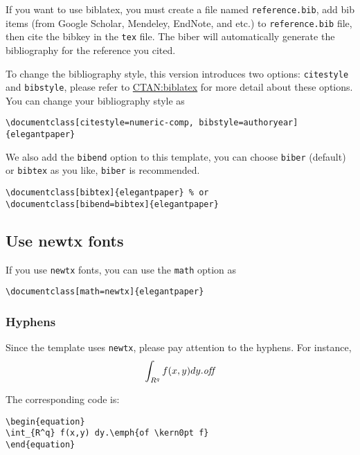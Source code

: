 \documentclass[lang=en,a4paper,bibend=bibtex]{elegantcs}
\begin{document}
If you want to use biblatex, you must create a file named \lstinline{reference.bib}, add bib items (from Google Scholar, Mendeley, EndNote, and etc.) to \lstinline{reference.bib} file, then cite the bibkey in the \lstinline{tex} file. The biber will automatically generate the bibliography for the reference you cited.


To change the bibliography style, this version introduces two options: \lstinline{citestyle} and \lstinline{bibstyle}, please refer to \href{https://ctan.org/pkg/biblatex}{CTAN:biblatex} for more detail about these options. You can change your bibliography style as

\begin{lstlisting}[style=Latex]
\documentclass[citestyle=numeric-comp, bibstyle=authoryear]{elegantpaper}
\end{lstlisting}

We also add the \lstinline{bibend} option to this template, you can choose \lstinline{biber} (default) or \lstinline{bibtex} as you like, \lstinline{biber} is recommended.

\begin{lstlisting}[style=Latex]
\documentclass[bibtex]{elegantpaper} % or
\documentclass[bibend=bibtex]{elegantpaper}
\end{lstlisting}



\subsection{Use newtx fonts}
If you use \lstinline{newtx} fonts, you can use the \lstinline{math} option as
\begin{lstlisting}[style=Latex]
\documentclass[math=newtx]{elegantpaper}
\end{lstlisting}


\subsubsection{Hyphens}
Since the template uses \lstinline{newtx}, please pay attention to the hyphens. For instance,
\begin{equation}
\int_{R^q} f(x,y) dy.\emph{of\kern0pt f}
\end{equation}

The corresponding code is:
\begin{lstlisting}[style=Latex]
\begin{equation}
\int_{R^q} f(x,y) dy.\emph{of \kern0pt f}
\end{equation}
\end{lstlisting}
\end{document}
